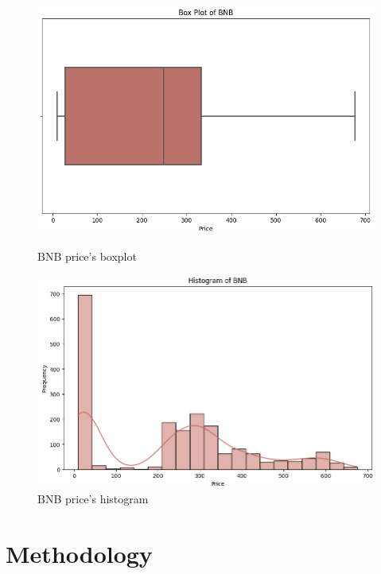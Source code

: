 \documentclass{ieeeojies}
\begin{document}
\begin{figure}[H]
	\centering
	\begin{minipage}{0.23\textwidth}
		\centering
		\includegraphics[width=1\textwidth]{bibliography/Images/BoxPlot_BNB.PNG}
		\caption{BNB price's boxplot}
		\label{fig:1}
	\end{minipage}
	\hfill
	\begin{minipage}{0.23\textwidth}
		\centering
		\includegraphics[width=1\textwidth]{bibliography/Images/Histogram_BNB.PNG}
		\caption{BNB price's histogram}
		\label{fig:2}
	\end{minipage}
\end{figure}
\section{Methodology}
\end{document}
